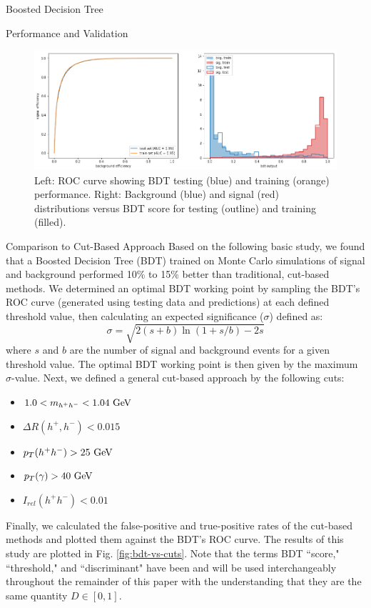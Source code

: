 \begin{section}{Boosted Decision Tree}
\begin{subsection}{Performance and Validation}
\begin{figure}[htb]
\begin{center}
\includegraphics[width=.95\linewidth]{Dissertation/fig/bdt-performance.png}
\end{center}
\caption{Left: ROC curve showing BDT testing (blue) and training (orange) performance. Right: Background (blue) and signal (red) distributions versus BDT score for testing (outline) and training (filled).}
\label{fig:bdt-performance}
\end{figure}

\end{subsection}
\begin{subsection}{Comparison to Cut-Based Approach}\label{comp-to-cuts}
Based on the following basic study, we found that a Boosted Decision Tree (BDT) trained on Monte Carlo simulations of signal and background performed 10\% to 15\% better than traditional, cut-based methods. We determined an optimal BDT working point by sampling the BDT's ROC curve (generated using testing data and predictions) at each defined threshold value, then calculating an expected significance ($\sigma$) defined as:
\begin{equation}\label{expsig-eq}
    \sigma = \sqrt{2(s+b)\ln(1+s/b)-2s}
\end{equation}
\noindent where $s$ and $b$ are the number of signal and background events for a given threshold value. The optimal BDT working point is then given by the maximum $\sigma$-value. Next, we defined a general cut-based approach by the following cuts:
\begin{itemize}
    \item $1.0 < m_{h^{+}h^{-}} < 1.04\textnormal{ GeV}$
    \item $\Delta R(h^{+}, h^{-}) < 0.015$
    \item $p_{T}(h^{+}h^{-}) > 25\textnormal{ GeV}$
    \item $p_{T}(\gamma) > 40\textnormal{ GeV}$
    \item $I_{rel}(h^{+}h^{-}) < 0.01$
\end{itemize}
\noindent Finally, we calculated the false-positive and true-positive rates of the cut-based methods and plotted them against the BDT's ROC curve. The results of this study are plotted in Fig. \ref{fig:bdt-vs-cuts}. Note that the terms BDT ``score," ``threshold," and ``discriminant" have been and will be used interchangeably throughout the remainder of this paper with the understanding that they are the same quantity $D \in [0,1]$.


\end{subsection}
\end{section}
